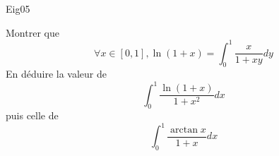 \begin{tiny}Eig05\end{tiny}
Montrer que
  \[\forall x \in [0,1], \ln(1+x)=\int_{0}^{1}\frac{x}{1+xy}dy\]
  En d{\'e}duire la valeur de
  \[\int_{0}^{1}\frac{\ln(1+x)}{1+x^2}dx\]
  puis celle de
  \[\int_{0}^{1}\frac{\arctan x}{1+x}dx\]
